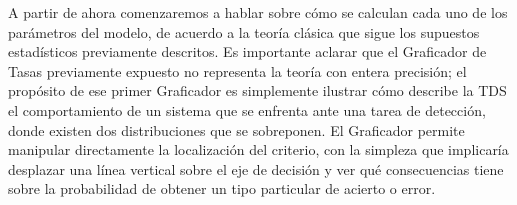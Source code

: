 A partir de ahora comenzaremos a hablar sobre cómo se calculan cada uno de los parámetros del modelo, de acuerdo a la teoría clásica que sigue los supuestos estadísticos previamente descritos.  Es importante aclarar que el Graficador de Tasas previamente expuesto no representa la teoría con entera precisión; el propósito de ese primer Graficador es simplemente ilustrar cómo describe la TDS el comportamiento de un sistema que se enfrenta ante una tarea de detección, donde existen dos distribuciones que se sobreponen. El Graficador permite manipular directamente la localización del criterio, con la simpleza que implicaría desplazar una línea vertical sobre el eje de decisión y ver qué consecuencias tiene sobre la probabilidad de obtener un tipo particular de acierto o error.



